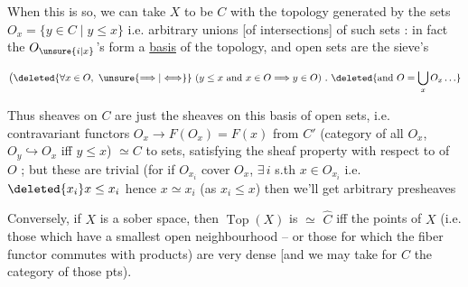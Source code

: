 When this is so, we can take $X$ to be $C$ with the topology generated by the sets $O_x=\{y\in C\mid y\leq x\}$ i.e. arbitrary unions [of intersections] of such sets : in fact \deleted{[NB $x\in\overline{\{y\}}$ iff $y\leq x$] i.e. $y\in O_x$] \unsure{of} Open} the $O_{\unsure{i|x}}$'s form a \uline{basis} of the topology, and open  sets  are  the  sieve's

\[\bigl(\deleted{\forall x\in O,\ \unsure{\Longrightarrow|\Longleftrightarrow}}\ (y\leq x\text{ and }x\in O\Longrightarrow y\in O)\ .\ \deleted{\text{and }O=\bigcup_xO_x\ldots}\]


Thus sheaves on $C$ are just the sheaves on this basis of open sets, i.e. contravariant functors $O_x\to F(O_x)=F(x)$ from $C'$  (category of all $O_x$, $O_y\hookrightarrow O_x$ iff $y\leq x$) $\simeq C$ to sets, satisfying the sheaf property  with respect to   of $O$ ; but these are trivial (for if $O_{x_i}$ cover $O_x$, $\exists\,i$ s.th $x\in O_{x_i}$ i.e. $\deleted{x_i}x\leq x_i$ hence $x\simeq x_i$ (as $x_i\leq x$) then we'll get arbitrary presheaves

Conversely, if $X$ is a sober space, then $\operatorname{Top}(X)$ is $\simeq$  $\widehat C$ iff the   points of $X$ (i.e. those which have a smallest open neighbourhood -- or those for which the fiber functor commutes with products) are very dense [and we may take for $C$ the category of those pts).



